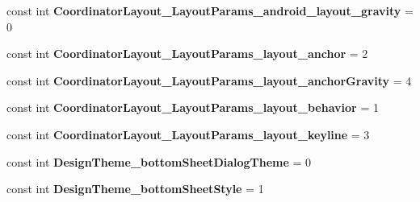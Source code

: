 \begin{DoxyCompactItemize}
\item 
\mbox{\label{class_sample_app_1_1_droid_1_1_resource_1_1_styleable_abee0c2fd8e3c2293f4376d969c2612af}} 
const int {\bfseries Coordinator\+Layout\+\_\+\+Layout\+Params\+\_\+android\+\_\+layout\+\_\+gravity} = 0
\item 
\mbox{\label{class_sample_app_1_1_droid_1_1_resource_1_1_styleable_a4b16daf868237bd0987b394aaa5d98c9}} 
const int {\bfseries Coordinator\+Layout\+\_\+\+Layout\+Params\+\_\+layout\+\_\+anchor} = 2
\item 
\mbox{\label{class_sample_app_1_1_droid_1_1_resource_1_1_styleable_a1638f91fcc74cdb63748d0d243b5cc86}} 
const int {\bfseries Coordinator\+Layout\+\_\+\+Layout\+Params\+\_\+layout\+\_\+anchor\+Gravity} = 4
\item 
\mbox{\label{class_sample_app_1_1_droid_1_1_resource_1_1_styleable_a115218cb336c0278171cf93641e4acee}} 
const int {\bfseries Coordinator\+Layout\+\_\+\+Layout\+Params\+\_\+layout\+\_\+behavior} = 1
\item 
\mbox{\label{class_sample_app_1_1_droid_1_1_resource_1_1_styleable_a614c806129589c4a3a8e9336f51fdf09}} 
const int {\bfseries Coordinator\+Layout\+\_\+\+Layout\+Params\+\_\+layout\+\_\+keyline} = 3
\item 
\mbox{\label{class_sample_app_1_1_droid_1_1_resource_1_1_styleable_a1b15675903a04ed35d0ba57f71feb8fe}} 
const int {\bfseries Design\+Theme\+\_\+bottom\+Sheet\+Dialog\+Theme} = 0
\item 
\mbox{\label{class_sample_app_1_1_droid_1_1_resource_1_1_styleable_a5057e589d2a109c438e20bcc6cfb42cb}} 
const int {\bfseries Design\+Theme\+\_\+bottom\+Sheet\+Style} = 1
\item 
\mbox{\label{class_sample_app_1_1_droid_1_1_resource_1_1_styleable_a01f6641c1750a6d1025a86cc7485794b}} 

\end{DoxyCompactItemize}
